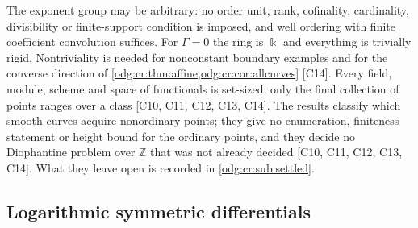 \documentclass[11pt,oneside]{article}
\numberwithin{equation}{section}
\theoremstyle{definition}
\theoremstyle{remark}
\newcommand{\Z}{\mathbb Z}
\newcommand{\src}[1]{\textup{\textsf{\small[#1]}}}
\begin{document}
The exponent group may be arbitrary: no order unit, rank, cofinality, cardinality,
divisibility or finite-support condition is imposed, and well ordering with finite
coefficient convolution suffices. For $\Gamma=0$ the ring is $\Bbbk$ and everything is
trivially rigid. Nontriviality is needed for nonconstant boundary examples
and for the converse direction of
\cref{odg:cr:thm:affine,odg:cr:cor:allcurves} \src{C14}. Every field, module, scheme and
space of functionals is set-sized; only the final collection of points ranges over a
class \src{C10, C11, C12, C13, C14}. The results classify which smooth curves acquire
nonordinary points; they give no enumeration, finiteness statement or height bound for
the ordinary points, and they decide no Diophantine problem over $\Z$ that was not
already decided \src{C10, C11, C12, C13, C14}. What they leave open is recorded in
\cref{odg:cr:sub:settled}.

\subsection{Logarithmic symmetric differentials}\label{odg:log:sub:log}
\end{document}
